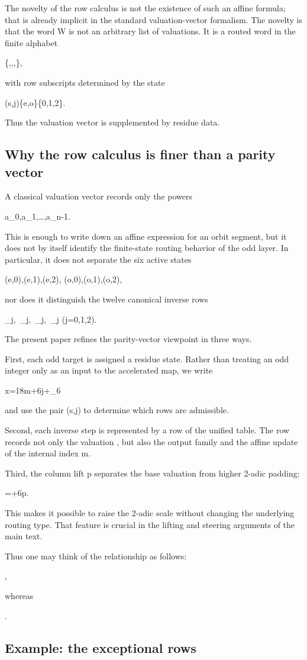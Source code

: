\documentclass[11pt,letterpaper]{amsart}
\def\mathrm#1{#1}%
\def\({}%
\def\){}%
\def\[{ }%
\def\]{ }%
\theoremstyle{definition}
\theoremstyle{plain}
\theoremstyle{plain}
\theoremstyle{remark}
\begin{document}
The novelty of the row calculus is not the existence of such an affine
formula; that is already implicit in the standard valuation-vector
formalism.  The novelty is that the word \(W\) is not an arbitrary list of
valuations.  It is a routed word in the finite alphabet
\[
\{\Psi,\psi,\omega,\Omega\},
\]
with row subscripts determined by the state
\[
(s,j)\in\{\mathrm e,\mathrm o\}\times\{0,1,2\}.
\]
Thus the valuation vector is supplemented by residue data.

\subsection*{Why the row calculus is finer than a parity vector}

A classical valuation vector records only the powers
\[
a_0,a_1,\ldots,a_{n-1}.
\]
This is enough to write down an affine expression for an orbit segment,
but it does not by itself identify the finite-state routing behavior of
the odd layer.  In particular, it does not separate the six active states
\[
(\mathrm e,0),(\mathrm e,1),(\mathrm e,2),
\qquad
(\mathrm o,0),(\mathrm o,1),(\mathrm o,2),
\]
nor does it distinguish the twelve canonical inverse rows
\[
\Psi_j,\ \psi_j,\ \omega_j,\ \Omega_j
\qquad
(j=0,1,2).
\]

The present paper refines the parity-vector viewpoint in three ways.

First, each odd target is assigned a residue state.  Rather than treating
an odd integer only as an input to the accelerated map, we write
\[
x=18m+6j+\delta_6
\]
and use the pair \((s,j)\) to determine which rows are admissible.

Second, each inverse step is represented by a row of the unified table.
The row records not only the valuation \(\sigma\), but also the output
family and the affine update of the internal index \(m\).

Third, the column lift \(p\) separates the base valuation \(\alpha\) from
higher \(2\)-adic padding:
\[
\sigma=\alpha+6p.
\]
This makes it possible to raise the \(2\)-adic scale without changing the
underlying routing type.  That feature is crucial in the lifting and
steering arguments of the main text.

Thus one may think of the relationship as follows:
\[
\quad\rightsquigarrow\quad
{},
\]
whereas
\[
\quad\rightsquigarrow\quad
{}.
\]

\subsection*{Example: the exceptional rows}
\end{document}
